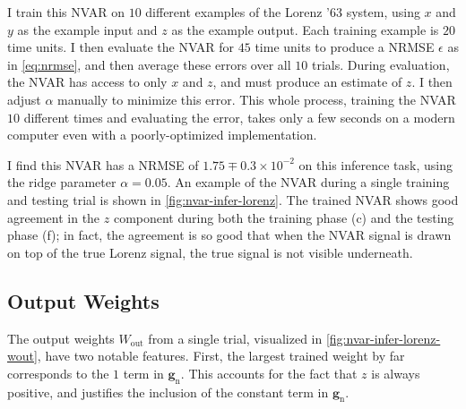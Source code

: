 I train this NVAR on $10$ different examples of the Lorenz '63
system, using $x$ and $y$ as the example input and $z$ as the example
output. Each training example is $20$ time units. I then evaluate
the NVAR for $45$ time units to produce a NRMSE $\epsilon$ as in
\cref{eq:nrmse}, and then average these errors over all $10$
trials. During evaluation, the NVAR has access to only $x$ and $z$,
and must produce an estimate of $z$. I then adjust $\alpha$ manually
to minimize this error. This whole process, training the NVAR $10$
different times and evaluating the error, takes only a few seconds on
a modern computer even with a poorly-optimized implementation.

I find this NVAR has a NRMSE of $1.75\mp0.3\times10^{-2}$ on this
inference task, using the ridge parameter $\alpha = 0.05$. An example
of the NVAR during a single training and testing trial is shown in
\cref{fig:nvar-infer-lorenz}. The trained NVAR shows good agreement in
the $z$ component during both the training phase (c) and the testing
phase (f); in fact, the agreement is so good that when the NVAR signal is
drawn on top of the true Lorenz signal, the true signal is not visible
underneath.

\subsection{Output Weights}

The output weights $W_\text{out}$ from a single trial, visualized in
\cref{fig:nvar-infer-lorenz-wout}, have two notable features. First,
the largest trained weight by far corresponds to the $1$ term in
$\bm{g}_\text{n}$. This accounts for the fact that $z$ is always
positive, and justifies the inclusion of the constant term in
$\bm{g}_\text{n}$.

